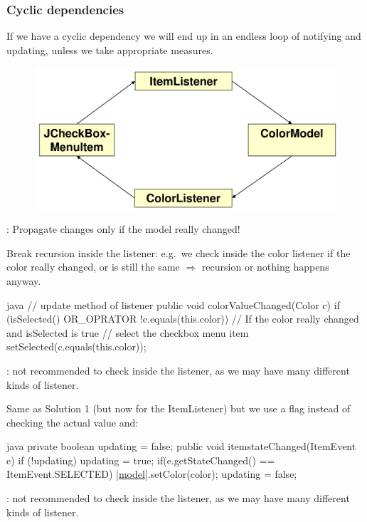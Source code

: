 \subsubsection{Cyclic dependencies}
\label{subsubsec:CyclicDependencies}
\begin{sectionbox}[Problem]\nospacing
  If we have a cyclic dependency we will end up in an endless loop of notifying
  and updating, unless we take appropriate measures.
\begin{figure}[H]
  \centering
  \includegraphics[width=0.7\columnwidth]{figures/cyclic_dependency.png}
  \label{fig:cyclic_dependency}
\end{figure}
: Propagate changes only if the model really changed!
\end{sectionbox}
\begin{sectionbox}\nospacing
    Break recursion inside the listener: e.g.\ we
    check inside the color listener if the color really changed, or is still the
    same $\Rightarrow$ recursion or nothing happens anyway.
      \begin{mintlinebox}{java}
        // update method of listener
       public void colorValueChanged(Color c){
          if (isSelected() OR_OPRATOR !c.equals(this.color))
          // If the color really changed and isSelected is true
          // select the checkbox menu item
            setSelected(c.equals(this.color));
        }
      \end{mintlinebox}
      : not recommended to check inside the listener, as we may have
      many different kinds of listener.
\end{sectionbox}
\begin{sectionbox}\nospacing
  Same as Solution 1 (but now for the ItemListener) but we use a flag instead of checking the actual value and:
      \begin{mintlinebox}{java}
       private boolean updating = false;
       public void itemstateChanged(ItemEvent e){
         if (!updating){
            updating = true;
            if(e.getStateChanged() == ItemEvent.SELECTED)
                 |\ul{model}|.setColor(color);
          }
          updating = false;
        }
      \end{mintlinebox}
      : not recommended to check inside the listener, as we may have
      many different kinds of listener.
\end{sectionbox}
